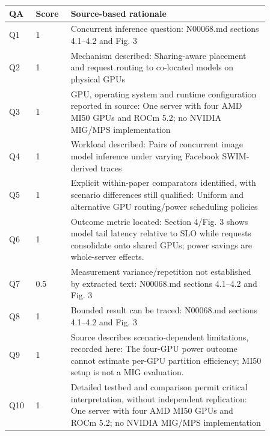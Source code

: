 \begin{longtable}{P{0.09\linewidth}P{0.10\linewidth}P{0.67\linewidth}}
\toprule QA & Score & Source-based rationale\\\midrule\endhead
Q1 & 1 & Concurrent inference question: N00068.md sections 4.1–4.2 and Fig. 3\\
Q2 & 1 & Mechanism described: Sharing-aware placement and request routing to co-located models on physical GPUs\\
Q3 & 1 & GPU, operating system and runtime configuration reported in source: One server with four AMD MI50 GPUs and ROCm 5.2; no NVIDIA MIG/MPS implementation\\
Q4 & 1 & Workload described: Pairs of concurrent image model inference under varying Facebook SWIM-derived traces\\
Q5 & 1 & Explicit within-paper comparators identified, with scenario differences still qualified: Uniform and alternative GPU routing/power scheduling policies\\
Q6 & 1 & Outcome metric located: Section 4/Fig. 3 shows model tail latency relative to SLO while requests consolidate onto shared GPUs; power savings are whole-server effects.\\
Q7 & 0.5 & Measurement variance/repetition not established by extracted text: N00068.md sections 4.1–4.2 and Fig. 3\\
Q8 & 1 & Bounded result can be traced: N00068.md sections 4.1–4.2 and Fig. 3\\
Q9 & 1 & Source describes scenario-dependent limitations, recorded here: The four-GPU power outcome cannot estimate per-GPU partition efficiency; MI50 setup is not a MIG evaluation.\\
Q10 & 1 & Detailed testbed and comparison permit critical interpretation, without independent replication: One server with four AMD MI50 GPUs and ROCm 5.2; no NVIDIA MIG/MPS implementation\\
\bottomrule\end{longtable}

